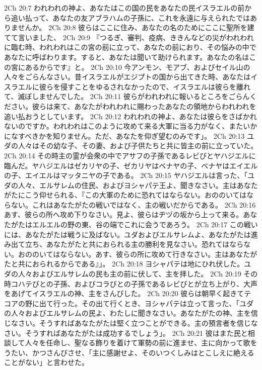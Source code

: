 2Ch 20:7  われわれの神よ、あなたはこの国の民をあなたの民イスラエルの前から追い払って、あなたの友アブラハムの子孫に、これを永遠に与えられたではありませんか。
2Ch 20:8  彼らはここに住み、あなたの名のためにここに聖所を建てて言いました、
2Ch 20:9  『つるぎ、審判、疫病、ききんなどの災がわれわれに臨む時、われわれはこの宮の前に立って、あなたの前におり、その悩みの中であなたに呼ばわります。すると、あなたは聞いて助けられます。あなたの名はこの宮にあるからです』と。
2Ch 20:10  今アンモン、モアブ、およびセイル山の人々をごらんなさい。昔イスラエルがエジプトの国から出てきた時、あなたはイスラエルに彼らを侵すことをゆるされなかったので、イスラエルは彼らを離れて、滅ぼしませんでした。
2Ch 20:11  彼らがわれわれに報いるところをごらんください。彼らは来て、あなたがわれわれに賜わったあなたの領地からわれわれを追い払おうとしています。
2Ch 20:12  われわれの神よ、あなたは彼らをさばかれないのですか。われわれはこのように攻めて来る大軍に当る力がなく、またいかになすべきかを知りません。ただ、あなたを仰ぎ望むのみです」。
2Ch 20:13  ユダの人々はその幼な子、その妻、および子供たちと共に皆主の前に立っていた。
2Ch 20:14  その時主の霊が会衆の中でアサフの子孫であるレビびとヤハジエルに臨んだ。ヤハジエルはゼカリヤの子、ゼカリヤはベナヤの子、ベナヤはエイエルの子、エイエルはマッタニヤの子である。
2Ch 20:15  ヤハジエルは言った、「ユダの人々、エルサレムの住民、およびヨシャパテ王よ、聞きなさい。主はあなたがたにこう仰せられる、『この大軍のために恐れてはならない。おののいてはならない。これはあなたがたの戦いではなく、主の戦いだからである。
2Ch 20:16  あす、彼らの所へ攻め下りなさい。見よ、彼らはヂヅの坂から上って来る。あなたがたはエルエルの野の東、谷の端でこれに会うであろう。
2Ch 20:17  この戦いには、あなたがたは戦うに及ばない。ユダおよびエルサレムよ、あなたがたは進み出て立ち、あなたがたと共におられる主の勝利を見なさい。恐れてはならない。おののいてはならない。あす、彼らの所に攻めて行きなさい。主はあなたがたと共におられるからである』」。
2Ch 20:18  ヨシャパテは地にひれ伏した。ユダの人々およびエルサレムの民も主の前に伏して、主を拝した。
2Ch 20:19  その時コハテびとの子孫、およびコラびとの子孫であるレビびとが立ち上がり、大声をあげてイスラエルの神、主をさんびした。
2Ch 20:20  彼らは朝早く起きてテコアの野に出て行った。その出て行くとき、ヨシャパテは立って言った、「ユダの人々およびエルサレムの民よ、わたしに聞きなさい。あなたがたの神、主を信じなさい。そうすればあなたがたは堅く立つことができる。主の預言者を信じなさい。そうすればあなたがたは成功するでしょう」。
2Ch 20:21  彼はまた民と相談して人々を任命し、聖なる飾りを着けて軍勢の前に進ませ、主に向かって歌をうたい、かつさんびさせ、「主に感謝せよ、そのいつくしみはとこしえに絶えることがない」と言わせた。
